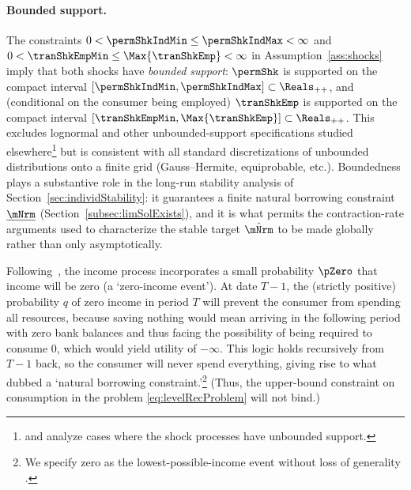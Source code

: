 \documentclass[\econtexRoot/BufferStockTheory]{subfiles}
\begin{document}
\paragraph{Bounded support.}
The constraints $0 < \permShkIndMin \leq \permShkIndMax < \infty$ and $0 < \tranShkEmpMin \leq \Max{\tranShkEmp} < \infty$ in Assumption~\ref{ass:shocks} imply that both shocks have \textit{bounded support}: $\permShk$ is supported on the compact interval $[\permShkIndMin,\permShkIndMax]\subset\Reals_{++}$, and (conditional on the consumer being employed) $\tranShkEmp$ is supported on the compact interval $[\tranShkEmpMin,\Max{\tranShkEmp}]\subset\Reals_{++}$.
This excludes lognormal and other unbounded-support specifications studied elsewhere\footnote{\cite{rabaultBorrowing} and \cite{lsIncFluct} analyze cases where the shock processes have unbounded support.} but is consistent with all standard discretizations of unbounded distributions onto a finite grid (Gauss--Hermite, equiprobable, etc.).
Boundedness plays a substantive role in the long-run stability analysis of Section~\ref{sec:individStability}: it guarantees a finite natural borrowing constraint $\underline{\mNrm}$ (Section~\ref{subsec:limSolExists}), and it is what permits the contraction-rate arguments used to characterize the stable target $\hat{\mNrm}$ to be made globally rather than only asymptotically.

Following~\cite{zeldesStochastic}, the income process incorporates a small probability $\pZero$ that income will be zero (a `zero-income event').
At date $T-1$, the (strictly positive) probability $q$ of zero income in period $T$ will prevent the consumer from spending all resources, because saving nothing would mean arriving in the following period with zero bank balances and thus facing the possibility of being required to consume 0, which would yield utility of $-\infty$.
This logic holds recursively from $T-1$ back, so  the consumer will never spend everything, giving rise to what \cite{aiyagari:ge} dubbed a `natural borrowing constraint.'\footnote{We specify zero as the lowest-possible-income event without loss of generality \citep{aiyagari:ge}.} (Thus, the upper-bound constraint on consumption in the problem \eqref{eq:levelRecProblem} will not bind.)


\hypertarget{PDV}{}
\end{document}
